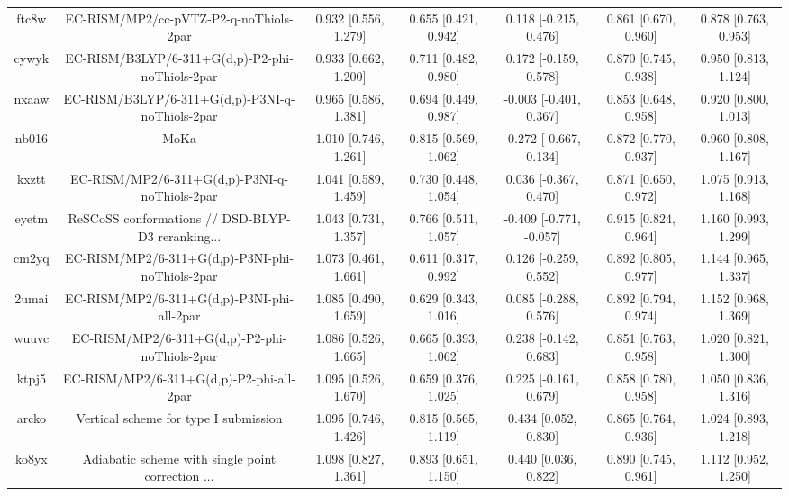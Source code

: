 \documentclass{article}
\begin{document}
\begin{center}
\begin{longtable}{|ccccccc|}
 ftc8w &             EC-RISM/MP2/cc-pVTZ-P2-q-noThiols-2par &  0.932 [0.556, 1.279] &  0.655 [0.421, 0.942] &    0.118 [-0.215, 0.476] &  0.861 [0.670, 0.960] &   0.878 [0.763, 0.953] \\
 cywyk &    EC-RISM/B3LYP/6-311+G(d,p)-P2-phi-noThiols-2par &  0.933 [0.662, 1.200] &  0.711 [0.482, 0.980] &    0.172 [-0.159, 0.578] &  0.870 [0.745, 0.938] &   0.950 [0.813, 1.124] \\
 nxaaw &    EC-RISM/B3LYP/6-311+G(d,p)-P3NI-q-noThiols-2par &  0.965 [0.586, 1.381] &  0.694 [0.449, 0.987] &   -0.003 [-0.401, 0.367] &  0.853 [0.648, 0.958] &   0.920 [0.800, 1.013] \\
 nb016 &                                               MoKa &  1.010 [0.746, 1.261] &  0.815 [0.569, 1.062] &   -0.272 [-0.667, 0.134] &  0.872 [0.770, 0.937] &   0.960 [0.808, 1.167] \\
 kxztt &      EC-RISM/MP2/6-311+G(d,p)-P3NI-q-noThiols-2par &  1.041 [0.589, 1.459] &  0.730 [0.448, 1.054] &    0.036 [-0.367, 0.470] &  0.871 [0.650, 0.972] &   1.075 [0.913, 1.168] \\
 eyetm &  ReSCoSS conformations // DSD-BLYP-D3 reranking... &  1.043 [0.731, 1.357] &  0.766 [0.511, 1.057] &  -0.409 [-0.771, -0.057] &  0.915 [0.824, 0.964] &   1.160 [0.993, 1.299] \\
 cm2yq &    EC-RISM/MP2/6-311+G(d,p)-P3NI-phi-noThiols-2par &  1.073 [0.461, 1.661] &  0.611 [0.317, 0.992] &    0.126 [-0.259, 0.552] &  0.892 [0.805, 0.977] &   1.144 [0.965, 1.337] \\
 2umai &         EC-RISM/MP2/6-311+G(d,p)-P3NI-phi-all-2par &  1.085 [0.490, 1.659] &  0.629 [0.343, 1.016] &    0.085 [-0.288, 0.576] &  0.892 [0.794, 0.974] &   1.152 [0.968, 1.369] \\
 wuuvc &      EC-RISM/MP2/6-311+G(d,p)-P2-phi-noThiols-2par &  1.086 [0.526, 1.665] &  0.665 [0.393, 1.062] &    0.238 [-0.142, 0.683] &  0.851 [0.763, 0.958] &   1.020 [0.821, 1.300] \\
 ktpj5 &           EC-RISM/MP2/6-311+G(d,p)-P2-phi-all-2par &  1.095 [0.526, 1.670] &  0.659 [0.376, 1.025] &    0.225 [-0.161, 0.679] &  0.858 [0.780, 0.958] &   1.050 [0.836, 1.316] \\
 arcko &              Vertical scheme for type I submission &  1.095 [0.746, 1.426] &  0.815 [0.565, 1.119] &     0.434 [0.052, 0.830] &  0.865 [0.764, 0.936] &   1.024 [0.893, 1.218] \\
 ko8yx &  Adiabatic scheme with single point correction ... &  1.098 [0.827, 1.361] &  0.893 [0.651, 1.150] &     0.440 [0.036, 0.822] &  0.890 [0.745, 0.961] &   1.112 [0.952, 1.250] \\

\end{longtable}
\end{center}
\end{document}
